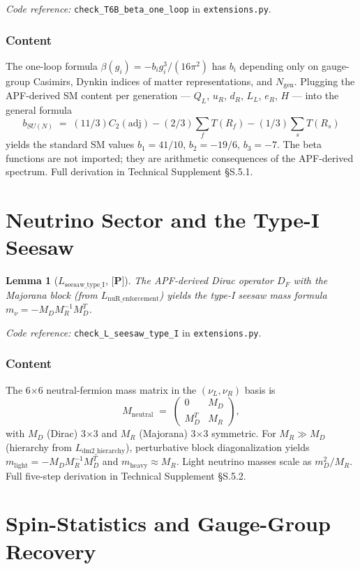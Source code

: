 \documentclass[11pt]{article}
\newcommand{\coderef}[2]{\smallskip\noindent\textit{Code reference:} \texttt{#1} in \texttt{#2}.}
\newcommand{\epitag}[1]{\textbf{[#1]}}
\newtheorem{lemma}[theorem]{Lemma}
\theoremstyle{definition}
\begin{document}
\coderef{check\_T6B\_beta\_one\_loop}{extensions.py}

\subsubsection*{Content}
The one-loop formula $\beta(g_i) = -b_i g_i^3 / (16\pi^2)$ has $b_i$ depending only on gauge-group Casimirs, Dynkin indices of matter representations, and $N_{\mathrm{gen}}$.  Plugging the APF-derived SM content per generation --- $Q_L$, $u_R$, $d_R$, $L_L$, $e_R$, $H$ --- into the general formula
\[
b_{SU(N)} \;=\; (11/3) C_2(\mathrm{adj}) - (2/3) \textstyle\sum_f T(R_f) - (1/3) \sum_s T(R_s)
\]
yields the standard SM values $b_1 = 41/10$, $b_2 = -19/6$, $b_3 = -7$.  The beta functions are not imported; they are arithmetic consequences of the APF-derived spectrum.  Full derivation in Technical Supplement \S S.5.1.

\section{Neutrino Sector and the Type-I Seesaw}\label{sec:seesaw}

\begin{lemma}[$L_{\mathrm{seesaw\_type\_I}}$, $\epitag{P}$]
The APF-derived Dirac operator $D_F$ with the Majorana block (from $L_{\mathrm{nuR\_enforcement}}$) yields the type-I seesaw mass formula $m_\nu = -M_D M_R^{-1} M_D^T$.
\end{lemma}

\coderef{check\_L\_seesaw\_type\_I}{extensions.py}

\subsubsection*{Content}
The 6$\times$6 neutral-fermion mass matrix in the $(\nu_L, \nu_R)$ basis is
\[
M_{\mathrm{neutral}} \;=\; \begin{pmatrix} 0 & M_D \\ M_D^T & M_R \end{pmatrix},
\]
with $M_D$ (Dirac) 3$\times$3 and $M_R$ (Majorana) 3$\times$3 symmetric.  For $M_R \gg M_D$ (hierarchy from $L_{\mathrm{dm2\_hierarchy}}$), perturbative block diagonalization yields $m_{\mathrm{light}} = -M_D M_R^{-1} M_D^T$ and $m_{\mathrm{heavy}} \approx M_R$.  Light neutrino masses scale as $m_D^2 / M_R$.  Full five-step derivation in Technical Supplement \S S.5.2.

\section{Spin-Statistics and Gauge-Group Recovery}\label{sec:spingauge}
\end{document}
